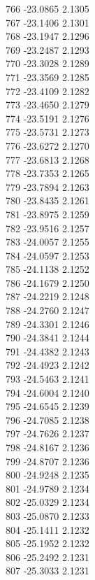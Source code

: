 \documentclass[11pt]{article}
\theoremstyle{definition}
\theoremstyle{plain}
\begin{document}
{766 -23.0865 2.1305\\
767 -23.1406 2.1301\\
768 -23.1947 2.1296\\
769 -23.2487 2.1293\\
770 -23.3028 2.1289\\
771 -23.3569 2.1285\\
772 -23.4109 2.1282\\
773 -23.4650 2.1279\\
774 -23.5191 2.1276\\
775 -23.5731 2.1273\\
776 -23.6272 2.1270\\
777 -23.6813 2.1268\\
778 -23.7353 2.1265\\
779 -23.7894 2.1263\\
780 -23.8435 2.1261\\
781 -23.8975 2.1259\\
782 -23.9516 2.1257\\
783 -24.0057 2.1255\\
784 -24.0597 2.1253\\
785 -24.1138 2.1252\\
786 -24.1679 2.1250\\
787 -24.2219 2.1248\\
788 -24.2760 2.1247\\
789 -24.3301 2.1246\\
790 -24.3841 2.1244\\
791 -24.4382 2.1243\\
792 -24.4923 2.1242\\
793 -24.5463 2.1241\\
794 -24.6004 2.1240\\
795 -24.6545 2.1239\\
796 -24.7085 2.1238\\
797 -24.7626 2.1237\\
798 -24.8167 2.1236\\
799 -24.8707 2.1236\\
800 -24.9248 2.1235\\
801 -24.9789 2.1234\\
802 -25.0329 2.1234\\
803 -25.0870 2.1233\\
804 -25.1411 2.1232\\
805 -25.1952 2.1232\\
806 -25.2492 2.1231\\
807 -25.3033 2.1231\\
}
\end{document}
